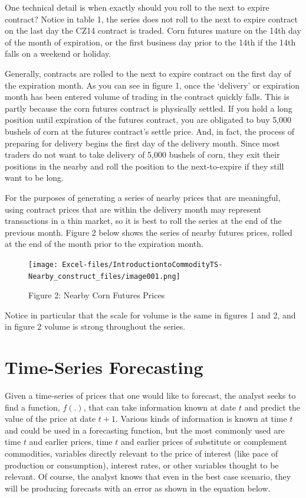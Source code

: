 \documentclass[
]{book}
\begin{document}
One technical detail is when exactly should you roll to the next to expire contract? Notice in table 1, the series does not roll to the next to expire contract on the last day the CZ14 contract is traded. Corn futures mature on the 14th day of the month of expiration, or the first business day prior to the 14th if the 14th falls on a weekend or holiday.

Generally, contracts are rolled to the next to expire contract on the first day of the expiration month. As you can see in figure 1, once the `delivery' or expiration month has been entered volume of trading in the contract quickly falls. This is partly because the corn futures contract is physically settled. If you hold a long position until expiration of the futures contract, you are obligated to buy 5,000 bushels of corn at the futures contract's settle price. And, in fact, the process of preparing for delivery begins the first day of the delivery month. Since most traders do not want to take delivery of 5,000 bushels of corn, they exit their positions in the nearby and roll the position to the next-to-expire if they still want to be long.

For the purposes of generating a series of nearby prices that are meaningful, using contract prices that are within the delivery month may represent transactions in a thin market, so it is best to roll the series at the end of the previous month. Figure 2 below shows the series of nearby futures prices, rolled at the end of the month prior to the expiration month.

\begin{figure}
\centering
\texttt{[image: Excel-files/IntroductiontoCommodityTS-Nearby\_construct\_files/image001.png]}
\caption{Figure 2: Nearby Corn Futures Prices}
\end{figure}

Notice in particular that the scale for volume is the same in figures 1 and 2, and in figure 2 volume is strong throughout the series.

\hypertarget{time-series-forecasting}{%
\section{Time-Series Forecasting}\label{time-series-forecasting}}

Given a time-series of prices that one would like to forecast, the analyst seeks to find a function, \(f(.)\), that can take information known at date \(t\) and predict the value of the price at date \(t+1\). Various kinds of information is known at time \(t\) and could be used in a forecasting function, but the most commonly used are time \(t\) and earlier prices, time \(t\) and earlier prices of substitute or complement commodities, variables directly relevant to the price of interest (like pace of production or consumption), interest rates, or other variables thought to be relevant. Of course, the analyst knows that even in the best case scenario, they will be producing forecasts with an error as shown in the equation below.
\end{document}
